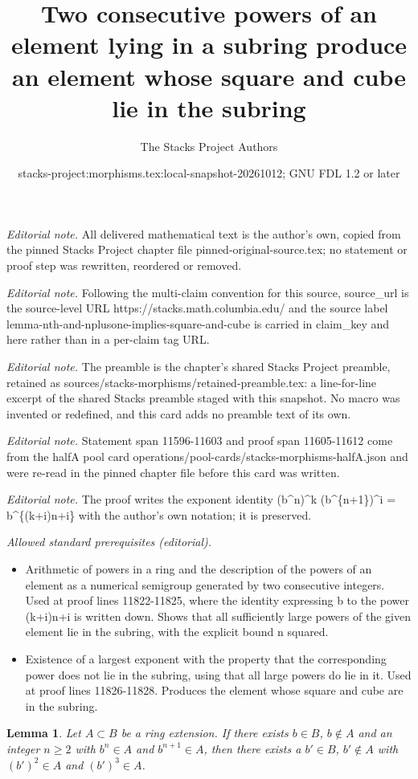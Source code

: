 \documentclass[10pt,a4paper]{amsart}
\title{Two consecutive powers of an element lying in a subring produce an element whose square and cube lie in the subring}
\author{The Stacks Project Authors}
\date{stacks-project:morphisms.tex:local-snapshot-20261012; GNU FDL 1.2 or later}
\theoremstyle{plain}
\newtheorem{lemma}[subsection]{Lemma}
\theoremstyle{definition}
\theoremstyle{remark}
\numberwithin{equation}{subsection}
\begin{document}
\maketitle
\noindent\textit{Editorial note.} All delivered mathematical text is the author's own, copied from the pinned Stacks Project chapter file pinned-original-source.tex; no statement or proof step was rewritten, reordered or removed.\par\medskip
\noindent\textit{Editorial note.} Following the multi-claim convention for this source, source\_url is the source-level URL https://stacks.math.columbia.edu/ and the source label lemma-nth-and-nplusone-implies-square-and-cube is carried in claim\_key and here rather than in a per-claim tag URL.\par\medskip
\noindent\textit{Editorial note.} The preamble is the chapter's shared Stacks Project preamble, retained as sources/stacks-morphisms/retained-preamble.tex: a line-for-line excerpt of the shared Stacks preamble staged with this snapshot. No macro was invented or redefined, and this card adds no preamble text of its own.\par\medskip
\noindent\textit{Editorial note.} Statement span 11596-11603 and proof span 11605-11612 come from the halfA pool card operations/pool-cards/stacks-morphisms-halfA.json and were re-read in the pinned chapter file before this card was written.\par\medskip
\noindent\textit{Editorial note.} The proof writes the exponent identity (b\textasciicircum{}n)\textasciicircum{}k (b\textasciicircum{}\{n+1\})\textasciicircum{}i = b\textasciicircum{}\{(k+i)n+i\} with the author's own notation; it is preserved.\par\medskip
\noindent\textit{Allowed standard prerequisites (editorial).}\begin{itemize}
\item Arithmetic of powers in a ring and the description of the powers of an element as a numerical semigroup generated by two consecutive integers. Used at proof lines 11822-11825, where the identity expressing b to the power (k+i)n+i is written down. Shows that all sufficiently large powers of the given element lie in the subring, with the explicit bound n squared.
\item Existence of a largest exponent with the property that the corresponding power does not lie in the subring, using that all large powers do lie in it. Used at proof lines 11826-11828. Produces the element whose square and cube are in the subring.
\end{itemize}\medskip
\begin{lemma}
\label{lemma-nth-and-nplusone-implies-square-and-cube}
Let $A \subset B$ be a ring extension. If there exists
$b \in B$, $b \not \in A$ and an integer $n \geq 2$ with
$b^n \in A$ and $b^{n + 1} \in A$, then there exists a
$b' \in B$, $b' \not \in A$
with $(b')^2 \in A$ and $(b')^3 \in A$.
\end{lemma}
\end{document}
